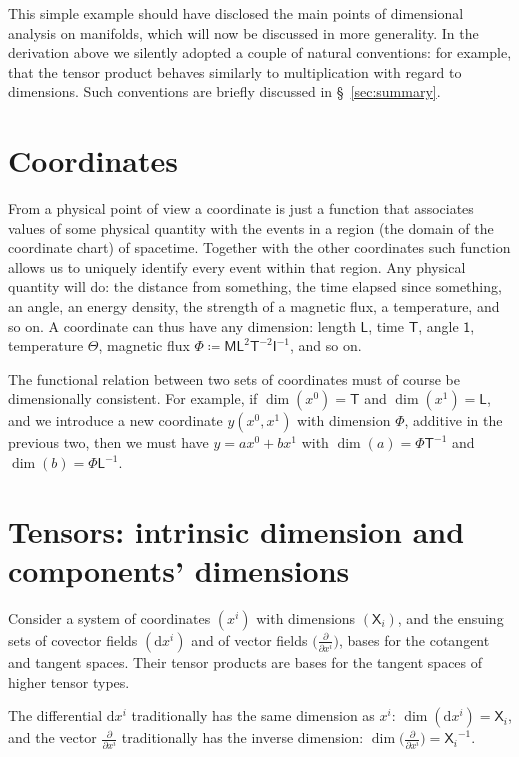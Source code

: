 \documentclass[\ifafour a4paper,12pt,\else a5paper,10pt,\fi%
onecolumn,oneside,article,%
british%
]{memoir}
\theoremstyle{remark}
\theoremstyle{innote}
\newcommand*{\de}{\partialup}%
\newcommand*{\di}{\mathrm{d}}%
\newcommand*{\defd}{\coloneqq}
\renewcommand*{\|}[1][]{\nonscript\,#1\vert\nonscript\;\mathopen{}}
\newcommand*{\sect}{\S}%
\newcommand*{\Un}{\textsf{1}}
\newcommand*{\Le}{\textsf{L}}
\newcommand*{\Ti}{\textsf{T}}
\newcommand*{\Ma}{\textsf{M}}
\newcommand*{\Te}{\Theta}
\newcommand*{\Cu}{\textsf{I}}
\newcommand*{\Fl}{\Phi}
\newcommand*{\Xx}{\textsf{X}}
\newcommand*{\dex}[1][i]{\frac{\de}{\de x^{#1}}}
\newcommand*{\dix}[1][i]{\di x^{#1}}
\begin{document}
This simple example should have disclosed the main points of dimensional
analysis on manifolds, which will now be discussed in more generality. In
the derivation above we silently adopted a couple of natural conventions:
for example, that the tensor product behaves similarly to multiplication
with regard to dimensions. Such conventions are briefly discussed in
\sect~\ref{sec:summary}.


\section{Coordinates}
\label{sec:coords}

From a physical point of view a coordinate is just a function that
associates values of some physical quantity with the events in a region
(the domain of the coordinate chart) of spacetime. Together with the other
coordinates such function allows us to uniquely identify every event
within that region. Any physical quantity will do: the distance from
something, the time elapsed since something, an angle, an energy density,
the strength of a magnetic flux, a temperature, and so on. A coordinate can
thus have any dimension: length $\Le$, time $\Ti$, angle $\Un$, temperature
$\Te$, magnetic flux $\Fl \defd \Ma\Le^{2}\Ti^{-2}\Cu^{-1}$, and so on.

The functional relation between two sets of coordinates must of course be
dimensionally consistent. For example, if $\dim(x^{0})=\Ti$ and
$\dim(x^{1})=\Le$, and we introduce a new coordinate $y(x^{0},x^{1})$
with dimension $\Fl$, additive in the previous two, then we must have
$y = a x^{0} + b x^{1}$ with $\dim(a) = \Fl\Ti^{-1}$ and
$\dim(b) = \Fl\Le^{-1}$.


\section{Tensors: intrinsic dimension and components' dimensions}
\label{sec:tensors}

Consider a system of coordinates $(x^i)$ with dimensions $(\Xx_i)$, and the
ensuing sets of covector fields $(\dix)$ and of vector fields
$\bigl(\dex\bigr)$, bases for the cotangent and tangent spaces. Their
tensor products are bases for the tangent spaces of higher tensor types.

The differential $\dix$ traditionally has the same dimension as $x^{i}$:
$\dim(\dix) = \Xx_{i}$, and the vector $\dex$ traditionally has the
inverse dimension: $\dim\bigl(\dex\bigr) = {\Xx_{i}}^{-1}$.
\end{document}

